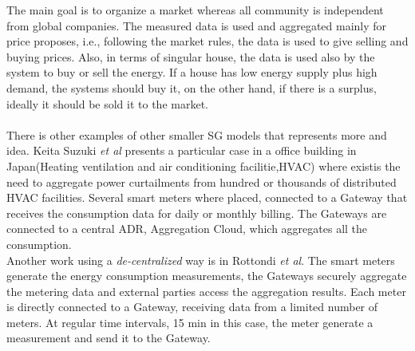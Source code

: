 The main goal is to organize a market whereas all community is independent from global companies. The measured data is used and aggregated mainly for price proposes, i.e., following the market rules, the data is used to give selling and buying prices. Also, in terms of singular house, the data is used also by the system to buy or sell the energy. If a house has low energy supply plus high demand, the systems should buy it, on the other hand, if there is a surplus, ideally it should be sold it to the market.\\
\\
There is other examples of other smaller SG models that represents more and idea. Keita Suzuki \textit{et al} \cite{DBLP:conf/isgteurope/SuzukiNYKMKA13}  presents a particular case in a office building in Japan(Heating ventilation and air conditioning facilitie,HVAC) where existis the need to aggregate power curtailments from hundred or thousands of distributed HVAC facilities. Several smart meters where placed, connected to a Gateway that receives the consumption data for daily or monthly billing.  The Gateways are connected to a central ADR, Aggregation Cloud, which aggregates all the consumption.\\
Another work using a \textit{de-centralized} way is in Rottondi \textit{et al}\cite{rottondi2012}.  The smart meters generate the energy consumption measurements, the Gateways securely aggregate the metering data and external parties access the aggregation results. Each meter is directly connected to a Gateway, receiving data from a limited number of meters. At regular time intervals, 15 min in this case, the meter generate a measurement and send it to the Gateway.















